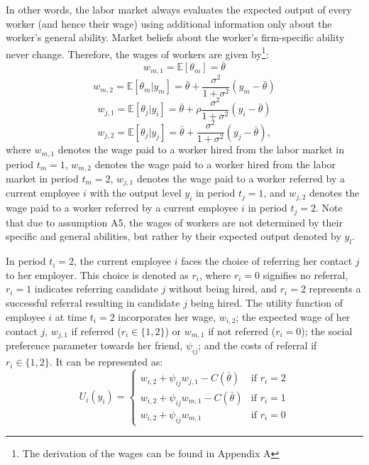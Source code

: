 \documentclass[12pt]{article}
\begin{document}
In other words, the labor market always evaluates the expected output of every worker (and hence their wage) using additional information only about the worker's general ability. Market beliefs about the worker's firm-specific ability never change. Therefore, the wages of workers are given by\footnote{The derivation of the wages can be found in Appendix A}:
\begin{equation}\label{eq_w_m_1}
    w_{m,1} = \mathbb{E}[\theta_{m}] = \bar{\theta}
\end{equation}
\begin{equation}\label{eq_w_m_2}
    w_{m,2} = \mathbb{E}[\theta_{m}|y_{m}] = \bar{\theta} + \frac{\sigma^2}{1+\sigma^2}(y_m - \bar{\theta})
\end{equation}
\begin{equation}\label{eq_w_j_1_y_i}
    w_{j,1} = \mathbb{E}[\theta_{j}|y_{i}] = \bar{\theta}+\rho\frac{\sigma^2}{1+\sigma^2}(y_i-\bar{\theta})
\end{equation}
\begin{equation}\label{eq_w_j_2}
    w_{j,2} = \mathbb{E}[\theta_j|y_j] = \bar{\theta}+\frac{\sigma^2}{1+\sigma^2}(y_j - \bar{\theta}),
\end{equation}
where $w_{m,1}$ denotes the wage paid to a worker hired from the labor market in period $t_m=1$, $w_{m,2}$ denotes the wage paid to a worker hired from the labor market in period $t_m=2$, $w_{j,1}$ denotes the wage paid to a worker referred by a current employee $i$ with the output level $y_i$ in period $t_j=1$, and $w_{j,2}$ denotes the wage paid to a worker referred by a current employee $i$ in period $t_j=2$. Note that due to assumption A5, the wages of workers are not determined by their specific and general abilities, but rather by their expected output denoted by $y_l$. 

In period $t_i = 2$, the current employee $i$ faces the choice of referring her contact $j$ to her employer. This choice is denoted as $r_i$, where $r_i = 0$ signifies no referral, $r_i = 1$ indicates referring candidate $j$ without being hired, and $r_i = 2$ represents a successful referral resulting in candidate $j$ being hired. The utility function of employee $i$ at time $t_i = 2$ incorporates her wage, $w_{i,2}$; the expected wage of her contact $j$, $w_{j,1}$ if referred ($r_{i} \in \lbrace 1,2 \rbrace$) or $w_{m,1}$ if not referred ($r_{i}=0$); the social preference parameter towards her friend, $\psi_{ij}$; and the costs of referral if $r_{i} \in \lbrace 1, 2\rbrace$. It can be represented as:
\begin{equation}\label{eq:utilitiy}
        U_{i}(y_i) = 
        \begin{cases}
		w_{i,2} + \psi_{ij} w_{j,1} - C(\bar{\theta}) & \text{if } r_i = 2 \\
		w_{i,2} + \psi_{ij} w_{m,1} - C(\bar{\theta}) & \text{if } r_i = 1 \\
        w_{i,2} + \psi_{ij} w_{m,1} & \text{if } r_i = 0
        \end{cases}
\end{equation}
\end{document}
